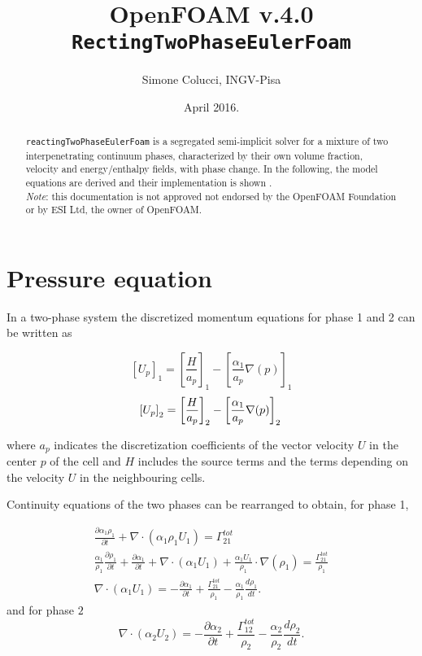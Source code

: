\documentclass[a4paper, 12 pt, fleqn]{article}
\title{OpenFOAM\textsuperscript{\textregistered} v.4.0 \\ {\tt RectingTwoPhaseEulerFoam}}
\author{Simone Colucci, INGV-Pisa}
\date{April 2016.}
\begin{document}
\maketitle 
\begin{abstract}
 {\tt reactingTwoPhaseEulerFoam} is a segregated semi-implicit solver for a mixture of two interpenetrating continuum phases, characterized by their own volume fraction, velocity and energy/enthalpy fields, with phase change. In the following, the model equations are derived and their implementation is shown .\\

 {\em Note}: this documentation is not approved not endorsed by the OpenFOAM Foundation or by ESI Ltd, the owner of OpenFOAM\textsuperscript{\textregistered}.
\end{abstract}


\section{Pressure equation}
In a two-phase system the discretized momentum equations for phase 1 and 2 can be written as

\begin{equation} \label{eq1}
\left[ U_p \right]_1= \left[ \frac{H}{a_p} \right]_1 - \left[ \frac{\alpha_1}{a_p}{\nabla(p)} \right]_1
\end{equation}
\begin{equation}\label{eq2}
\left[ U_p \right]_2= \left[ \frac{H}{a_p} \right]_2 - \left[ \frac{\alpha_1}{a_p}{\nabla(p)} \right]_2\\
\end{equation}

where $a_p$ indicates the discretization coefficients of the vector velocity $U$ in the center $p$ of the cell and $H$ includes the source terms and the terms depending on the velocity $U$ in the neighbouring cells.

 Continuity equations of the two phases can be rearranged to obtain, for phase 1,
 
\begin{eqnarray}\label{eq3}
\frac{\partial \alpha_1 \rho_1}{\partial t} + \nabla \cdot \left( \alpha_1 \rho_1 U_1 \right) = \Gamma_{21}^{tot} \nonumber\\
\frac{\alpha_1}{\rho_1}\frac{\partial \rho_1}{\partial t} + \frac{\partial \alpha_1}{\partial t} + \nabla \cdot \left( \alpha_1 U_1 \right) + \frac{\alpha_1 U_1}{\rho_1} \cdot \nabla \left( \rho_1 \right )= \frac{\Gamma_{21}^{tot}}{\rho_1} \nonumber\\
\nabla \cdot \left( \alpha_1 U_1 \right) = - \frac{\partial \alpha_1}{\partial t} + \frac{\Gamma_{21}^{tot}}{\rho_1} - \frac{\alpha_1}{\rho_1} \frac{d\rho_1}{dt}.
\end{eqnarray}
and for phase $2$ 
\begin{equation}\label{eq4}
\nabla \cdot \left( \alpha_2 U_2 \right) = - \frac{\partial \alpha_2}{\partial t} + \frac{\Gamma_{12}^{tot}}{\rho_2} - \frac{\alpha_2}{\rho_2} \frac{d\rho_2}{dt}.
\end{equation}
\end{document}

